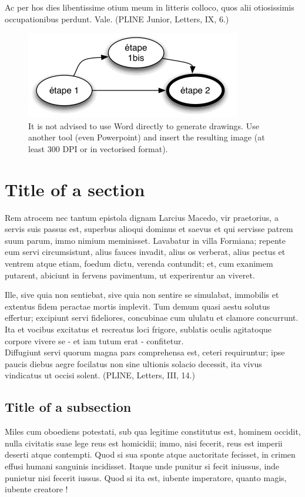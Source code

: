 \documentclass[10pt,a5paper,twoside]{article}
\begin{document}
Ac per hos dies libentissime otium meum in litteris colloco, quos alii otiosissimis occupationibus perdunt. Vale. (PLINE Junior, Letters, IX, 6.) 
\begin{figure}[htbp]
\begin{center} 
\includegraphics[scale=0.4]{illustration2.jpg} 
\caption{It is not advised to use Word directly to generate drawings. Use another tool (even Powerpoint) and insert the resulting image (at least 300 DPI or in vectorised format).}
\label{figure}
\end{center}
\end{figure} 

\section{Title of a section}
Rem atrocem nec tantum epistola dignam Larcius Macedo, vir praetorius, a servis suis passus est, superbus alioqui dominus et saevus et qui servisse patrem suum parum, immo nimium meminisset. Lavabatur in villa Formiana; repente eum servi circumsistunt, alius fauces invadit, alius os verberat, alius pectus et ventrem atque etiam, foedum dictu, verenda contundit; et, cum exanimem putarent, abiciunt in fervens pavimentum, ut experirentur an viveret. 

Ille, sive quia non sentiebat, sive quia non sentire se simulabat, immobilis et extentus fidem peractae mortis implevit. Tum demum quasi aestu solutus effertur; excipiunt servi fideliores, concubinae cum ululatu et clamore concurrunt. Ita et vocibus excitatus et recreatus loci frigore, sublatis oculis agitatoque corpore vivere se - et iam tutum erat - confitetur. \\
\newpage
Diffugiunt servi quorum magna pars comprehensa est, ceteri requiruntur; ipse paucis diebus aegre focilatus non sine ultionis solacio decessit, ita vivus vindicatus ut occisi solent. (PLINE, Letters, III, 14.)
\subsection{Title of a subsection}
Miles cum oboediens potestati, sub qua legitime constitutus est, hominem occidit, nulla civitatis suae lege reus est homicidii; immo, nisi fecerit, reus est imperii deserti atque contempti. Quod si sua sponte atque auctoritate fecisset, in crimen effusi humani sanguinis incidisset. Itaque unde punitur si fecit iniussus, inde punietur nisi fecerit iussus. Quod si ita est, iubente imperatore, quanto magis, iubente creatore ! 
\end{document}
